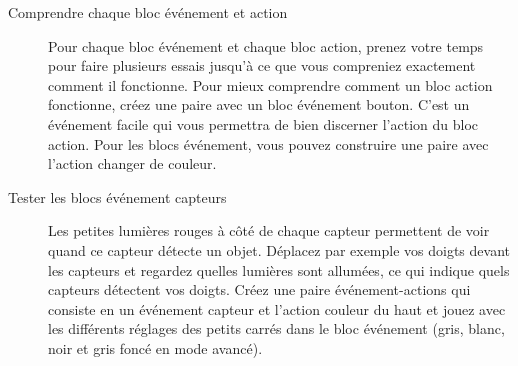 \label{a.tips}


\begin{description}

\item[Comprendre chaque bloc événement et action]
Pour chaque bloc événement et chaque bloc action,
prenez votre temps pour faire plusieurs essais jusqu'à ce que vous compreniez
exactement comment il fonctionne.
Pour mieux comprendre comment un bloc action fonctionne,
créez une paire avec un bloc événement bouton.
C'est un événement facile qui vous permettra de bien discerner l'action du bloc action.
Pour les blocs événement, vous pouvez construire une paire avec l'action changer de couleur.

\item[Tester les blocs événement capteurs]
Les petites lumières rouges à côté de chaque capteur permettent de voir quand ce capteur détecte
un objet.
Déplacez par exemple vos doigts devant les capteurs et regardez quelles lumières sont allumées,
ce qui indique quels capteurs détectent vos doigts.
Créez une paire événement-actions qui consiste en un événement capteur et l'action couleur du haut
et jouez avec les différents réglages des petits carrés dans le bloc événement (gris, blanc, noir et
gris foncé en mode avancé).

\end{description}


